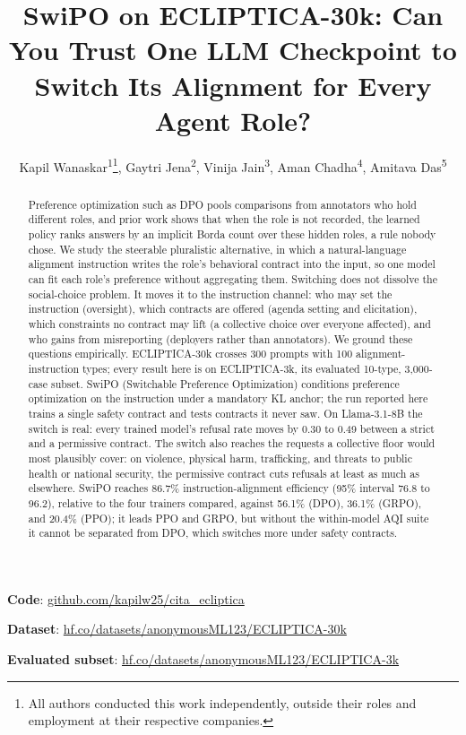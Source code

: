 \documentclass[letterpaper]{article} %
\title{SwiPO on ECLIPTICA-30k: Can You Trust One LLM Checkpoint to Switch Its Alignment for Every Agent Role?}
\author{
    Kapil Wanaskar\textsuperscript{\rm 1}\thanks{All authors conducted this work independently, outside their roles and employment at their respective companies.},
    Gaytri Jena\textsuperscript{\rm 2},
    Vini{}ja Jain\textsuperscript{\rm 3},  %
    Aman Chadha\textsuperscript{\rm 4},
    Amitava Das\textsuperscript{\rm 5}
}
\begin{document}
\maketitle

\begin{abstract}
Preference optimization such as DPO pools comparisons from annotators who hold different roles, and prior work shows that when the role is not recorded, the learned policy ranks answers by an implicit Borda count over these hidden roles, a rule nobody chose. We study the steerable pluralistic alternative, in which a natural-language alignment instruction writes the role's behavioral contract into the input, so one model can fit each role's preference without aggregating them. Switching does not dissolve the social-choice problem. It moves it to the instruction channel: who may set the instruction (oversight), which contracts are offered (agenda setting and elicitation), which constraints no contract may lift (a collective choice over everyone affected), and who gains from misreporting (deployers rather than annotators). We ground these questions empirically. ECLIPTICA-30k crosses 300 prompts with 100 alignment-instruction types; every result here is on ECLIPTICA-3k, its evaluated 10-type, 3,000-case subset. SwiPO (Switchable Preference Optimization) conditions preference optimization on the instruction under a mandatory KL anchor; the run reported here trains a single safety contract and tests contracts it never saw. On Llama-3.1-8B the switch is real: every trained model's refusal rate moves by 0.30 to 0.49 between a strict and a permissive contract. The switch also reaches the requests a collective floor would most plausibly cover: on violence, physical harm, trafficking, and threats to public health or national security, the permissive contract cuts refusals at least as much as elsewhere. SwiPO reaches 86.7\% instruction-alignment efficiency (95\% interval 76.8 to 96.2), relative to the four trainers compared, against 56.1\% (DPO), 36.1\% (GRPO), and 20.4\% (PPO); it leads PPO and GRPO, but without the within-model AQI suite it cannot be separated from DPO, which switches more under safety contracts.
\end{abstract}

\begin{links}
    \renewcommand{\link}[2]{\par\textbf{#1}: \url{#2}}%
    \link{Code}{github.com/kapilw25/cita_ecliptica}
    \link{Dataset}{hf.co/datasets/anonymousML123/ECLIPTICA-30k}
    \link{Evaluated subset}{hf.co/datasets/anonymousML123/ECLIPTICA-3k}
\end{links}
\end{document}
